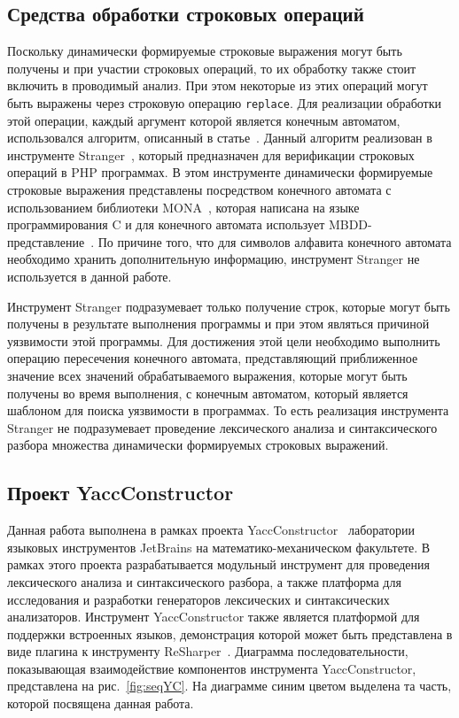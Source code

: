 \subsection{Средства обработки строковых операций}

Поскольку динамически формируемые строковые выражения могут быть получены и при участии строковых операций, то их обработку также стоит включить в проводимый анализ. При этом некоторые из этих операций могут быть выражены через строковую операцию \verb|replace|. Для реализации обработки этой операции, каждый аргумент которой является конечным автоматом, использовался алгоритм, описанный в статье~\cite{ReplaceFangYu}. Данный алгоритм реализован в инструменте Stranger~\cite{StrangerFangYu}, который предназначен для верификации строковых операций в PHP программах. В этом инструменте динамически формируемые строковые выражения представлены посредством конечного автомата с использованием библиотеки MONA~\cite{MONAUrl}, которая написана на языке программирования C и для конечного автомата использует MBDD-представление~\cite{MBDD}. По причине того, что для символов алфавита конечного автомата необходимо хранить дополнительную информацию, инструмент Stranger не используется в данной работе.

Инструмент Stranger подразумевает только получение строк, которые могут быть получены в результате выполнения программы и при этом являться причиной уязвимости этой программы. Для достижения этой цели необходимо выполнить операцию пересечения конечного автомата, представляющий приближенное значение всех значений обрабатываемого выражения, которые могут быть получены во время выполнения, с конечным автоматом, который является шаблоном для поиска уязвимости в программах. То есть реализация инструмента Stranger не подразумевает проведение лексического анализа и синтаксического разбора множества динамически формируемых строковых выражений.

\subsection{Проект YaccConstructor}

Данная работа выполнена в рамках проекта YaccConstructor~\cite{YCUrl} лаборатории языковых инструментов JetBrains на математико-механическом факультете. В рамках этого проекта разрабатывается модульный инструмент для проведения лексического анализа и синтаксического разбора, а также платформа для исследования и разработки генераторов лексических и синтаксических анализаторов. Инструмент YaccConstructor также является платформой для поддержки встроенных языков, демонстрация которой может быть представлена в виде плагина к инструменту ReSharper~\cite{ReSharper}. Диаграмма последовательности, показывающая взаимодействие компонентов инструмента YaccConstructor, представлена на рис.~\ref{fig:seqYC}. На диаграмме синим цветом выделена та часть, которой посвящена данная работа. 

